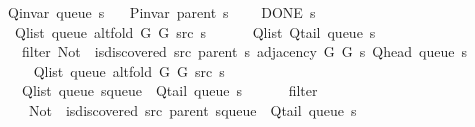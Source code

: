 \begin{isabellebody}
\ \ \ {\isachardoublequoteopen}Q{\isacharunderscore}{\kern0pt}invar\ {\isacharparenleft}{\kern0pt}queue\ s{\isacharparenright}{\kern0pt}{\isachardoublequoteclose}\isanewline
\ \ \ {\isachardoublequoteopen}P{\isacharunderscore}{\kern0pt}invar\ {\isacharparenleft}{\kern0pt}parent\ s{\isacharparenright}{\kern0pt}{\isachardoublequoteclose}\isanewline
\ \ \ {\isachardoublequoteopen}{\isasymnot}\ DONE\ s{\isachardoublequoteclose}\isanewline
\ \ \isanewline
\ \ \ \ {\isachardoublequoteopen}Q{\isacharunderscore}{\kern0pt}list\ {\isacharparenleft}{\kern0pt}queue\ {\isacharparenleft}{\kern0pt}alt{\isacharunderscore}{\kern0pt}fold\ G{}\ G{}\ src\ s{\isacharparenright}{\kern0pt}{\isacharparenright}{\kern0pt}\ {\isacharequal}{\kern0pt}\isanewline
\ \ \ \ \ Q{\isacharunderscore}{\kern0pt}list\ {\isacharparenleft}{\kern0pt}Q{\isacharunderscore}{\kern0pt}tail\ {\isacharparenleft}{\kern0pt}queue\ s{\isacharparenright}{\kern0pt}{\isacharparenright}{\kern0pt}\ {\isacharat}{\kern0pt}\isanewline
\ \ \ \ \ filter\ {\isacharparenleft}{\kern0pt}Not\ {\isasymcirc}\ is{\isacharunderscore}{\kern0pt}discovered\ src\ {\isacharparenleft}{\kern0pt}parent\ s{\isacharparenright}{\kern0pt}{\isacharparenright}{\kern0pt}\ {\isacharparenleft}{\kern0pt}adjacency\ G{}\ G{}\ s\ {\isacharparenleft}{\kern0pt}Q{\isacharunderscore}{\kern0pt}head\ {\isacharparenleft}{\kern0pt}queue\ s{\isacharparenright}{\kern0pt}{\isacharparenright}{\kern0pt}{\isacharparenright}{\kern0pt}{\isachardoublequoteclose}\isanewline
%
\isadelimproof
%
\endisadelimproof
%
\isatagproof
{}\isamarkupfalse%
\ {\isacharminus}{\kern0pt}\isanewline
\ \ \isamarkupfalse%
\isanewline
\ \ \ \ {\isachardoublequoteopen}Q{\isacharunderscore}{\kern0pt}list\ {\isacharparenleft}{\kern0pt}queue\ {\isacharparenleft}{\kern0pt}alt{\isacharunderscore}{\kern0pt}fold\ G{}\ G{}\ src\ s{\isacharparenright}{\kern0pt}{\isacharparenright}{\kern0pt}\ {\isacharequal}{\kern0pt}\isanewline
\ \ \ \ \ Q{\isacharunderscore}{\kern0pt}list\ {\isacharparenleft}{\kern0pt}queue\ {\isacharparenleft}{\kern0pt}s{\isasymlparr}queue\ {\isacharcolon}{\kern0pt}{\isacharequal}{\kern0pt}\ Q{\isacharunderscore}{\kern0pt}tail\ {\isacharparenleft}{\kern0pt}queue\ s{\isacharparenright}{\kern0pt}{\isasymrparr}{\isacharparenright}{\kern0pt}{\isacharparenright}{\kern0pt}\ {\isacharat}{\kern0pt}\isanewline
\ \ \ \ \ filter\isanewline
\ \ \ \ \ \ {\isacharparenleft}{\kern0pt}Not\ {\isasymcirc}\ is{\isacharunderscore}{\kern0pt}discovered\ src\ {\isacharparenleft}{\kern0pt}parent\ {\isacharparenleft}{\kern0pt}s{\isasymlparr}queue\ {\isacharcolon}{\kern0pt}{\isacharequal}{\kern0pt}\ Q{\isacharunderscore}{\kern0pt}tail\ {\isacharparenleft}{\kern0pt}queue\ s{\isacharparenright}{\kern0pt}{\isasymrparr}{\isacharparenright}{\kern0pt}{\isacharparenright}{\kern0pt}{\isacharparenright}{\kern0pt}\isanewline

\end{isabellebody}
